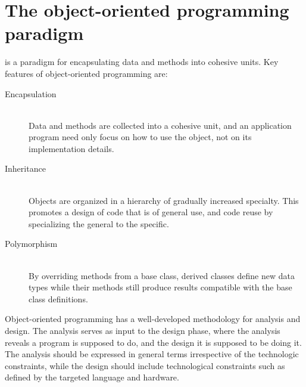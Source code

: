 \chapter{The object-oriented programming paradigm}
\label{chap:oopp}
 is a paradigm for encapsulating data and methods into cohesive units. Key features of object-oriented programming are:
\begin{description}
\item[Encapsulation]~\\
Data and methods are collected into a cohesive unit, and an application program need only focus on how to use the object, not on its implementation details.
\item[Inheritance]~\\
Objects are organized in a hierarchy of gradually increased specialty. This promotes a design of code that is of general use, and code reuse by specializing the general to the specific.
\item[Polymorphism]~\\
By overriding methods from a base class, derived classes define new data types while their methods still produce results compatible with the base class definitions.
\end{description}

Object-oriented programming has a well-developed methodology for analysis and design. The analysis serves as input to the design phase, where the analysis reveals  a program is supposed to do, and the design  it is supposed to be doing it. The analysis should be expressed in general terms irrespective of the technologic constraints, while the design should include technological constraints such as defined by the targeted language and hardware.

